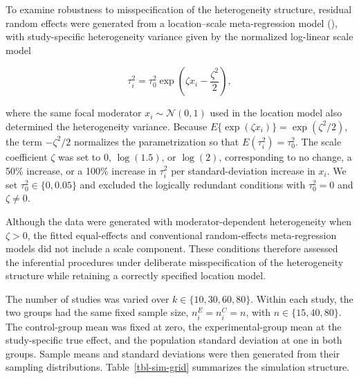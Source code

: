 \documentclass[
  man,
  longtable,
  nolmodern,
  notxfonts,
  notimes,
  colorlinks=true,linkcolor=blue,citecolor=blue,urlcolor=blue]{apa7}
\begin{document}
To examine robustness to misspecification of the heterogeneity
structure, residual random effects were generated from a location--scale
meta-regression model (), with study-specific heterogeneity variance given by
the normalized log-linear scale model

\[
\tau_i^2
=
\tau_0^2
\exp\left(
\zeta x_i - \frac{\zeta^2}{2}
\right),
\]

where the same focal moderator \(x_i \sim \mathcal{N}(0,1)\) used in the
location model also determined the heterogeneity variance. Because
\(E\{\exp(\zeta x_i)\}=\exp(\zeta^2/2)\), the term \(-\zeta^2/2\)
normalizes the parametrization so that \(E(\tau_i^2)=\tau_0^2\). The
scale coefficient \(\zeta\) was set to \(0\), \(\log(1.5)\), or
\(\log(2)\), corresponding to no change, a 50\% increase, or a 100\%
increase in \(\tau_i^2\) per standard-deviation increase in \(x_i\). We
set \(\tau_0^2\in\{0,0.05\}\) and excluded the logically redundant
conditions with \(\tau_0^2=0\) and \(\zeta\ne0\).

Although the data were generated with moderator-dependent heterogeneity
when \(\zeta>0\), the fitted equal-effects and conventional
random-effects meta-regression models did not include a scale component.
These conditions therefore assessed the inferential procedures under
deliberate misspecification of the heterogeneity structure while
retaining a correctly specified location model.

The number of studies was varied over \(k\in\{10,30,60,80\}\). Within
each study, the two groups had the same fixed sample size,
\(n_i^E=n_i^C=n\), with \(n\in\{15,40,80\}\). The control-group mean was
fixed at zero, the experimental-group mean at the study-specific true
effect, and the population standard deviation at one in both groups.
Sample means and standard deviations were then generated from their
sampling distributions. Table~\ref{tbl-sim-grid} summarizes the
simulation structure.
\end{document}
